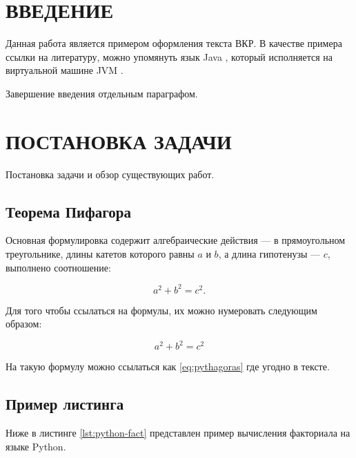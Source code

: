 





\renewcommand*\contentsname{СОДЕРЖАНИЕ}
{
\setcounter{tocdepth}{3}
\tableofcontents
}
\pagebreak

\section*{ВВЕДЕНИЕ}\label{sec:introduction}

Данная работа является примером оформления текста ВКР. В качестве
примера ссылки на литературу, можно упомянуть язык Java \cite{gosling2000java},
который исполняется на виртуальной машине JVM \cite{lindholm2014java}.

Завершение введения отдельным параграфом.

\clearpage
\pagebreak

\section{ПОСТАНОВКА ЗАДАЧИ}\label{sec:overview}

Постановка задачи и обзор существующих работ.

\subsection{Теорема Пифагора}\label{sec:pythagoras}

Основная формулировка содержит алгебраические действия --- в
прямоугольном треугольнике, длины катетов которого равны \(a\) и \(b\),
а длина гипотенузы --- \(c\), выполнено соотношение:

\[
a^2 + b^2 = c^2.
\]

Для того чтобы ссылаться на формулы, их можно нумеровать следующим
образом:

\begin{equation}\label{eq:pythagoras}{
a^2 + b^2 = c^2
}\end{equation}

На такую формулу можно ссылаться как \ref{eq:pythagoras} где угодно в
тексте.

\subsection{Пример листинга}\label{sec:lst-example}

Ниже в листинге \ref{lst:python-fact} представлен пример вычисления
факториала на языке Python.

